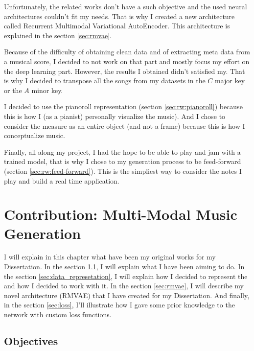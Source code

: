 \documentclass[12pt]{report}
\begin{document}
Unfortunately, the related works don't have a such objective and the used neural architectures couldn't fit my needs.
That is why I created a new architecture called Recurrent Multimodal Variational AutoEncoder.
This architecture is explained in the section \ref{sec:rmvae}.

Because of the difficulty of obtaining clean data and of extracting meta data from a musical score, I decided to not work on that part and mostly focus my effort on the deep learning part.
However, the results I obtained didn't satisfied my.
That is why I decided to transpose all the songs from my datasets in the $C$ major key or the $A$ minor key.

I decided to use the pianoroll representation (section \ref{sec:rw:pianoroll}) because this is how I (as a pianist) personally visualize the music).
And I chose to consider the measure as an entire object (and not a frame) because this is how I conceptualize music.

Finally, all along my project, I had the hope to be able to play and jam with a trained model, that is why I chose to my generation process to be feed-forward (section \ref{sec:rw:feed-forward}).
This is the simpliest way to consider the notes I play and build a real time application.

\newpage
\chapter{Contribution: Multi-Modal Music Generation}
\label{chap:contribution}

I will explain in this chapter what have been my original works for my Dissertation.
In the section \ref{sec:objectives}, I will explain what I have been aiming to do.
In the section \ref{sec:data_represetation}, I will explain how I decided to represent the and how I decided to work with it.
In the section \ref{sec:rmvae}, I will describe my novel architecture (RMVAE) that I have created for my Dissertation.
And finally, in the section \ref{sec:loss}, I'll illustrate how I gave some prior knowledge to the network with custom loss functions.


\section{Objectives}
\label{sec:objectives}
\end{document}
